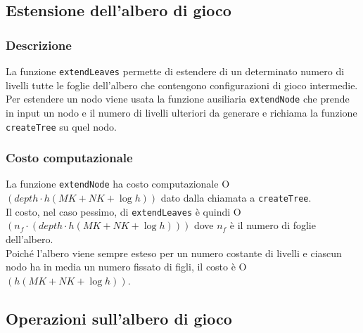 \documentclass[11pt]{article}
\begin{document}
\subsection*{Estensione dell'albero di gioco}
\subsubsection*{Descrizione}
La funzione \texttt{extendLeaves} permette di estendere di un determinato numero di livelli tutte le foglie dell'albero che contengono configurazioni di gioco intermedie.\\
Per estendere un nodo viene usata la funzione ausiliaria \texttt{extendNode} che prende in input un nodo e il numero di livelli ulteriori da generare e richiama la funzione \texttt{createTree} su quel nodo.
\subsubsection*{Costo computazionale}
La funzione \texttt{extendNode} ha costo computazionale O$(depth \cdot h(MK+NK+\log h))$ dato dalla chiamata a \texttt{createTree}.\\
Il costo, nel caso pessimo, di \texttt{extendLeaves} è quindi O$(n_f\cdot(depth \cdot h(MK+NK+\log h)))$ dove $n_f$ è il numero di foglie dell'albero.\\
Poiché l'albero viene sempre esteso per un numero costante di livelli e ciascun nodo ha in media un numero fissato di figli, il costo è O$(h(MK+NK+\log h))$.\\

\newpage

\subsection*{Operazioni sull'albero di gioco}
\end{document}
